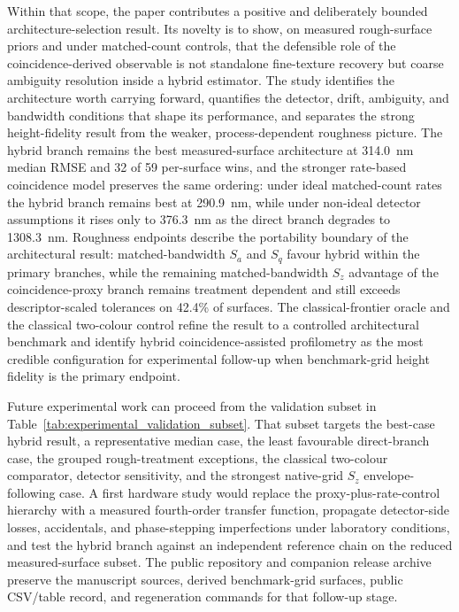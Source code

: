 \documentclass[photonics,article,submit,pdftex,moreauthors]{Definitions/mdpi}
\begin{document}
Within that scope, the paper contributes a positive and deliberately bounded architecture-selection result. Its novelty is to show, on measured rough-surface priors and under matched-count controls, that the defensible role of the coincidence-derived observable is not standalone fine-texture recovery but coarse ambiguity resolution inside a hybrid estimator. The study identifies the architecture worth carrying forward, quantifies the detector, drift, ambiguity, and bandwidth conditions that shape its performance, and separates the strong height-fidelity result from the weaker, process-dependent roughness picture. The hybrid branch remains the best measured-surface architecture at 314.0~nm median RMSE and 32 of 59 per-surface wins, and the stronger rate-based coincidence model preserves the same ordering: under ideal matched-count rates the hybrid branch remains best at 290.9~nm, while under non-ideal detector assumptions it rises only to 376.3~nm as the direct branch degrades to 1308.3~nm. Roughness endpoints describe the portability boundary of the architectural result: matched-bandwidth $S_a$ and $S_q$ favour hybrid within the primary branches, while the remaining matched-bandwidth $S_z$ advantage of the coincidence-proxy branch remains treatment dependent and still exceeds descriptor-scaled tolerances on 42.4\% of surfaces. The classical-frontier oracle and the classical two-colour control refine the result to a controlled architectural benchmark and identify hybrid coincidence-assisted profilometry as the most credible configuration for experimental follow-up when benchmark-grid height fidelity is the primary endpoint.

Future experimental work can proceed from the validation subset in Table~\ref{tab:experimental_validation_subset}. That subset targets the best-case hybrid result, a representative median case, the least favourable direct-branch case, the grouped rough-treatment exceptions, the classical two-colour comparator, detector sensitivity, and the strongest native-grid $S_z$ envelope-following case. A first hardware study would replace the proxy-plus-rate-control hierarchy with a measured fourth-order transfer function, propagate detector-side losses, accidentals, and phase-stepping imperfections under laboratory conditions, and test the hybrid branch against an independent reference chain on the reduced measured-surface subset. The public repository and companion release archive preserve the manuscript sources, derived benchmark-grid surfaces, public CSV/table record, and regeneration commands for that follow-up stage.
\end{document}
